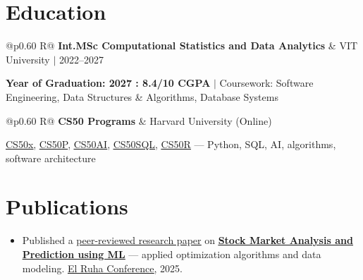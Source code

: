 \documentclass[a4paper,10pt]{article}
\newcommand{\ulink}[2]{\href{#1}{\uline{#2}}}
\newcommand{\subheading}[1]{{\color[HTML]{0A0A0A}\fontsize{12}{14}\selectfont\bfseries #1}}
\newcommand{\meta}[1]{{\color[HTML]{5C5C5C}\fontsize{10.5}{12.5}\selectfont #1}}
\begin{document}
\vspace{2pt}

\section{Education}
\vspace{2pt}

\begin{tabularx}{\linewidth}{@{}p{0.60\linewidth} R@{}}
\subheading{Int.MSc Computational Statistics and Data Analytics} & \meta{VIT University $|$ 2022--2027}
\end{tabularx}
\vspace{1pt}
{\color[HTML]{3A3A3A}\fontsize{11}{14}\selectfont \textbf{Year of Graduation: 2027 : 8.4/10 CGPA} $|$ Coursework: Software Engineering, Data Structures \& Algorithms, Database Systems}

\begin{tabularx}{\linewidth}{@{}p{0.60\linewidth} R@{}}
\subheading{CS50 Programs} & \meta{Harvard University (Online)}
\end{tabularx}
\vspace{1pt}
{\color[HTML]{3A3A3A}\fontsize{11}{14}\selectfont \ulink{https://cs50.harvard.edu/certificates/b14b78df-e05c-413e-a607-1dd27303053a}{CS50x}, \ulink{https://cs50.harvard.edu/certificates/32477052-9db4-49c4-a5a4-d7e58429ca2c}{CS50P}, \ulink{https://cs50.harvard.edu/certificates/9cdb4d4a-1250-4f8e-9fd7-191864e0f919}{CS50AI}, \ulink{https://cs50.harvard.edu/certificates/bc486f24-f085-4e61-8536-80940b97a1b9}{CS50SQL}, \ulink{https://cs50.harvard.edu/certificates/666838e6-a053-4d82-b179-a60fe745fd84}{CS50R} --- Python, SQL, AI, algorithms, software architecture}

\vspace{2pt}

\section{Publications}
\vspace{2pt}
\begin{itemize}[nosep, leftmargin=1.5em, itemsep=1pt, topsep=2pt]
  \item {\color[HTML]{0A0A0A}\fontsize{11}{14}\selectfont
  Published a \ulink{https://www.elruha.org/_files/ugd/614b1f_6b95e1b697bf452b9907ba46e0151c05.pdf\#page=774}{peer-reviewed research paper} on \ulink{https://github.com/su-jin1425/Set-Project}{\textbf{Stock Market Analysis and Prediction using ML}} --- applied optimization algorithms and data modeling. \ulink{https://www.elruha.org/congress-books}{El Ruha Conference}, 2025.}
\end{itemize}
\end{document}
